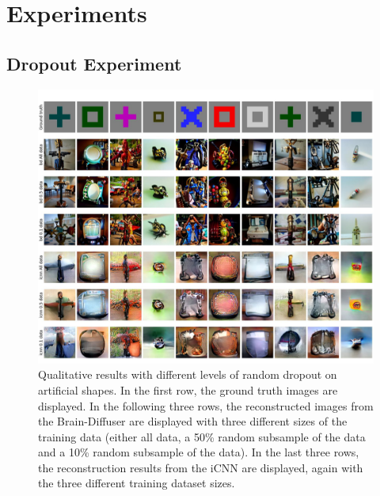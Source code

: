 \chapter{Experiments}
\section{Dropout Experiment}

\begin{figure}[H]
   \centering
   \includegraphics[width=1\textwidth]{plots/dropout_qual_random_art.JPEG}
   \caption[Qualitative results random dropout on artificial shapes]{Qualitative results with different levels of random dropout on artificial shapes. In the first row, the ground truth images are displayed. In the following three rows, the reconstructed images from the Brain-Diffuser are displayed with three different sizes of the training data (either all data, a 50\% random subsample of the data and a 10\% random subsample of the data). In the last three rows, the reconstruction results from the iCNN are displayed, again with the three different training dataset sizes.}\label{fig:dropout_qual_random_art}
 \end{figure}


